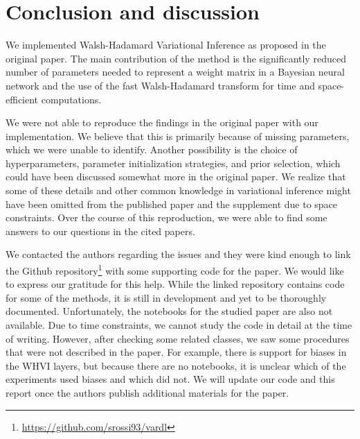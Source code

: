 \documentclass[11pt, twocolumn]{article}
\begin{document}
    \section{Conclusion and discussion}\label{sec:conclusion-and-discussion}
    We implemented Walsh-Hadamard Variational Inference as proposed in the original paper.
    The main contribution of the method is the significantly reduced number of parameters needed to represent a weight matrix in a Bayesian neural network and the use of the fast Walsh-Hadamard transform for time and space-efficient computations.

    We were not able to reproduce the findings in the original paper with our implementation.
    We believe that this is primarily because of missing parameters, which we were unable to identify.
    Another possibility is the choice of hyperparameters, parameter initialization strategies, and prior selection, which could have been discussed somewhat more in the original paper.
    We realize that some of these details and other common knowledge in variational inference might have been omitted from the published paper and the supplement due to space constraints.
    Over the course of this reproduction, we were able to find some answers to our questions in the cited papers.

    We contacted the authors regarding the issues and they were kind enough to link the Github repository\footnote{\url{https://github.com/srossi93/vardl}} with some supporting code for the paper.
    We would like to express our gratitude for this help.
    While the linked repository contains code for some of the methods, it is still in development and yet to be thoroughly documented.
    Unfortunately, the notebooks for the studied paper are also not available.
    Due to time constraints, we cannot study the code in detail at the time of writing.
    However, after checking some related classes, we saw some procedures that were not described in the paper.
    For example, there is support for biases in the WHVI layers, but because there are no notebooks, it is unclear which of the experiments used biases and which did not.
    We will update our code and this report once the authors publish additional materials for the paper.

    
    
\end{document}
